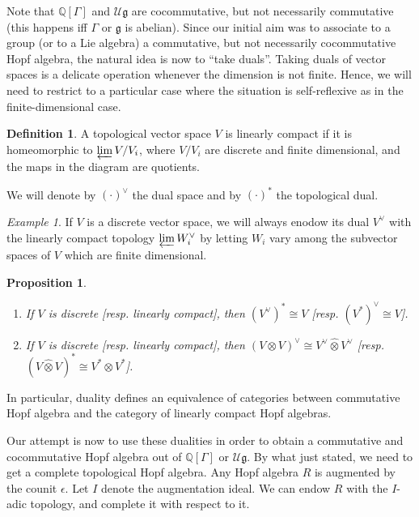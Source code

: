 \documentclass{amsart}
\newtheorem{prop}[thm]{Proposition}
\theoremstyle{definition}
\newtheorem{dfn}[thm]{Definition}
\theoremstyle{remark}
\theoremstyle{remark}
\newtheorem{example}[thm]{Example}
\newcommand{\Q}{\mathbb{Q}}
\newcommand{\mcU}{\mathcal{U}}
\newcommand{\mfg}{\mathfrak{g}}
\begin{document}
Note that $\Q[\Gamma]$ and $\mcU\mfg$ are cocommutative, but not necessarily commutative (this happens iff $\Gamma$ or $\mfg$ is abelian). Since our initial aim was to associate to a group (or to a Lie algebra) a commutative, but not necessarily cocommutative Hopf algebra, the natural idea is now to ``take duals''. Taking duals of vector spaces is a delicate operation whenever the dimension is not finite. Hence, we will need to restrict to a particular case where the situation is self-reflexive as in the finite-dimensional case.

\begin{dfn}
A topological vector space $V$ is linearly compact if it is homeomorphic to $\varprojlim V/V_i$, where $V/V_i$ are discrete and finite dimensional, and the maps in the diagram are quotients.  
\end{dfn}

We will denote by $(\cdot)^\vee$ the dual space and by $(\cdot)^*$ the topological dual.

\begin{example}
If $V$ is a discrete vector space, we will always enodow its dual $V^\vee$ with the linearly compact topology $\varprojlim W_i^\vee$ by letting $W_i$ vary among the subvector spaces of $V$ which are finite dimensional.
\end{example}

\begin{prop}
\begin{enumerate}
	\item If $V$ is discrete [resp. linearly compact], then $(V^\vee)^*\cong V$ [resp. $(V^*)^\vee\cong V$].
	\item If $V$ is discrete [resp. linearly compact], then $(V\otimes V)^\vee\cong V^\vee\hat{\otimes}V^\vee$ [resp. $(V\hat{\otimes}V)^*\cong V^*\otimes V^*$].
\end{enumerate}
\end{prop}

In particular, duality defines an equivalence of categories between commutative Hopf algebra and the category of linearly compact Hopf algebras.

Our attempt is now to use these dualities in order to obtain a commutative and cocommutative Hopf algebra out of $\Q[\Gamma]$ or $\mcU\mfg$. By what just stated, we need to get a complete topological Hopf algebra. Any Hopf algebra $R$ is augmented by the counit $\epsilon$. Let $I$ denote the augmentation ideal. We can endow $R$ with the $I$-adic topology, and complete it with respect to it.
\end{document}
